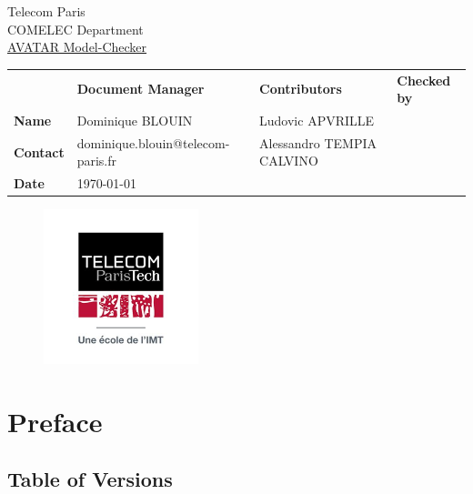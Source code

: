 \documentclass[12pt]{article}
\begin{document}
\sloppy 

\begin{center}
\Large Telecom Paris \\
\Large COMELEC Department \\
\vspace{20 pt}
\underline{\Huge AVATAR Model-Checker}
\end{center}

\begin{table}[H]
\large
\centering
\begin{adjustbox}{width=\textwidth}
\begin{tabular}{ |p{1.6cm}|p{6.0cm}|p{4.4cm}|p{4.2cm}| }
\hhline{----}
 & \textbf{Document Manager} & \textbf{Contributors}  & \textbf{Checked by}  \\ 
\hhline{----}
\textbf{Name}   & Dominique BLOUIN & Ludovic APVRILLE &
\multirow{2}{*}{%
} \\
\hhline{--~~}
\textbf{Contact} & dominique.blouin@telecom-paris.fr & Alessandro TEMPIA CALVINO & \\ 
\hhline{--~~}
\textbf{Date} & \today &  &  \\ 
\hline
\end{tabular}
\end{adjustbox}
\end{table}

\begin{figure}[!h]
\centering
\includegraphics[width=0.4\textwidth]{images/image1.png}
\end{figure}

\newpage
\tableofcontents


\newpage
\section{Preface}

\subsection{Table of Versions}
\end{document}
